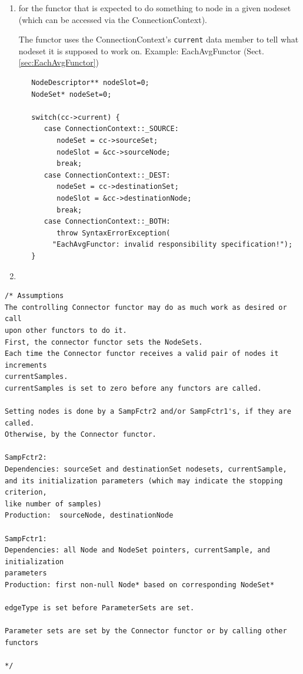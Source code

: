 \begin{enumerate}
  \item for the functor that is expected to do something to node in a
  given nodeset (which can be accessed via the ConnectionContext).
  
  The functor uses the ConnectionContext's \verb!current! data member to tell
  what nodeset it is supposed to work on. Example: EachAvgFunctor
  (Sect.\ref{sec:EachAvgFunctor})

{\tiny
\begin{lstlisting}
   NodeDescriptor** nodeSlot=0;
   NodeSet* nodeSet=0;

   switch(cc->current) {
      case ConnectionContext::_SOURCE:
         nodeSet = cc->sourceSet;
         nodeSlot = &cc->sourceNode;
         break;
      case ConnectionContext::_DEST:
         nodeSet = cc->destinationSet;
         nodeSlot = &cc->destinationNode;
         break;
      case ConnectionContext::_BOTH:
         throw SyntaxErrorException(
	    "EachAvgFunctor: invalid responsibility specification!");
   }
\end{lstlisting}
}
  
  \item 
\end{enumerate}


\begin{lstlisting}
/* Assumptions
The controlling Connector functor may do as much work as desired or call 
upon other functors to do it.
First, the connector functor sets the NodeSets.
Each time the Connector functor receives a valid pair of nodes it increments 
currentSamples.
currentSamples is set to zero before any functors are called.

Setting nodes is done by a SampFctr2 and/or SampFctr1's, if they are called. 
Otherwise, by the Connector functor.

SampFctr2:
Dependencies: sourceSet and destinationSet nodesets, currentSample, 
and its initialization parameters (which may indicate the stopping criterion, 
like number of samples)
Production:  sourceNode, destinationNode

SampFctr1:
Dependencies: all Node and NodeSet pointers, currentSample, and initialization 
parameters
Production: first non-null Node* based on corresponding NodeSet*

edgeType is set before ParameterSets are set.

Parameter sets are set by the Connector functor or by calling other functors

*/
\end{lstlisting}




